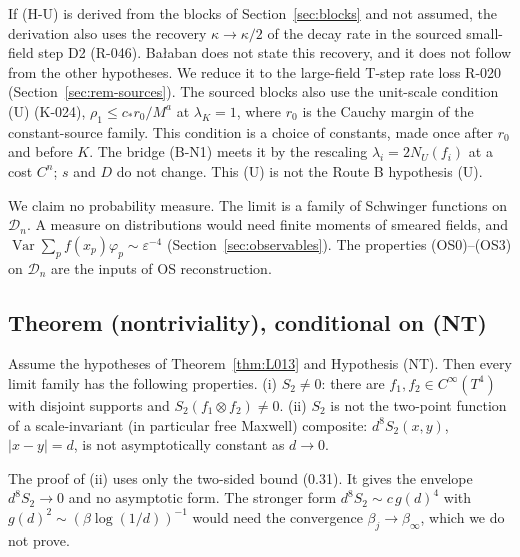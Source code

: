 \begin{remark}[inputs of (H-U)]
If (H-U) is derived from the blocks of Section~\ref{sec:blocks} and not assumed, the derivation also uses the recovery $\kappa\to\kappa/2$ of the decay rate in the sourced small-field step D2 (R-046). Ba{\l}aban does not state this recovery, and it does not follow from the other hypotheses. We reduce it to the large-field T-step rate loss R-020 (Section~\ref{sec:rem-sources}). The sourced blocks also use the unit-scale condition (U) (K-024), $\rho_1\le c_*r_0/M^a$ at $\lambda_K=1$, where $r_0$ is the Cauchy margin of the constant-source family. This condition is a choice of constants, made once after $r_0$ and before $K$. The bridge (B-N1) meets it by the rescaling $\lambda_i=2N_U(f_i)$ at a cost $C^n$; $s$ and $D$ do not change. This (U) is not the Route B hypothesis (U).
\end{remark}

\begin{remark}
We claim no probability measure. The limit is a family of Schwinger functions on $\mathcal D_n$. A measure on distributions would need finite moments of smeared fields, and $\operatorname{Var}\sum_pf(x_p)\varphi_p\sim\varepsilon^{-4}$ (Section~\ref{sec:observables}). The properties (OS0)--(OS3) on $\mathcal D_n$ are the inputs of OS reconstruction.
\end{remark}

\subsection{Theorem (nontriviality), conditional on (NT)}\label{sec:nontrivthm}
\begin{theorem}\label{thm:L014}
Assume the hypotheses of Theorem~\ref{thm:L013} and Hypothesis (NT). Then every limit family has the following properties.
(i) $S_2\ne0$: there are $f_1,f_2\in C^\infty(T^4)$ with disjoint supports and $S_2(f_1\otimes f_2)\ne0$.
(ii) $S_2$ is not the two-point function of a scale-invariant (in particular free Maxwell) composite: $d^8S_2(x,y)$, $|x-y|=d$, is not asymptotically constant as $d\to0$.
\end{theorem}
\begin{remark}[form of (ii)]\label{corr:nt}
The proof of (ii) uses only the two-sided bound (0.31). It gives the envelope $d^8S_2\to0$ and no asymptotic form. The stronger form $d^8S_2\sim c\,g(d)^4$ with $g(d)^2\sim(\beta\log(1/d))^{-1}$ would need the convergence $\beta_j\to\beta_\infty$, which we do not prove.
\end{remark}

